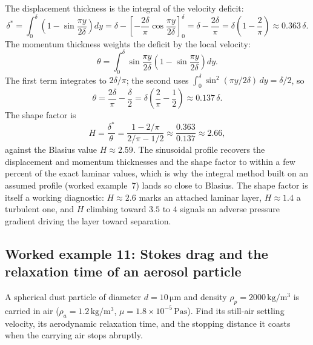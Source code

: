 The displacement thickness is the integral of the velocity deficit:
\[
\delta^* = \int_0^\delta\!\left(1 - \sin\frac{\pi y}{2\delta}\right)dy
= \delta - \left[-\frac{2\delta}{\pi}\cos\frac{\pi y}{2\delta}
\right]_0^\delta = \delta - \frac{2\delta}{\pi} = \delta\!\left(1 -
\frac{2}{\pi}\right) \approx 0.363\,\delta.
\]
The momentum thickness weights the deficit by the local velocity:
\[
\theta = \int_0^\delta \sin\frac{\pi y}{2\delta}\!\left(1 -
\sin\frac{\pi y}{2\delta}\right)dy.
\]
The first term integrates to $2\delta/\pi$; the second uses
$\int_0^\delta\sin^2(\pi y/2\delta)\,dy = \delta/2$, so
\[
\theta = \frac{2\delta}{\pi} - \frac{\delta}{2} = \delta\!\left(
\frac{2}{\pi} - \frac{1}{2}\right) \approx 0.137\,\delta.
\]
The shape factor is
\[
H = \frac{\delta^*}{\theta} = \frac{1 - 2/\pi}{2/\pi - 1/2} \approx
\frac{0.363}{0.137} \approx 2.66,
\]
against the Blasius value $H \approx 2.59$. The sinusoidal profile
recovers the displacement and momentum thicknesses and the shape
factor to within a few percent of the exact laminar values, which is
why the integral method built on an assumed profile (worked
example~7) lands so close to Blasius. The shape factor is itself a
working diagnostic: $H\approx2.6$ marks an attached laminar layer,
$H\approx1.4$ a turbulent one, and $H$ climbing toward $3.5$ to $4$
signals an adverse pressure gradient driving the layer toward
separation.



\subsection*{Worked example 11: Stokes drag and the relaxation time of an aerosol particle}

A spherical dust particle of diameter $d = 10\,\si{\micro\meter}$ and
density $\rho_p = 2000\,\si{\kilogram\per\meter\cubed}$ is carried in
air ($\rho_a = 1.2\,\si{\kilogram\per\meter\cubed}$, $\mu = 1.8\times
10^{-5}\,\si{\pascal\second}$). Find its still-air settling velocity,
its aerodynamic relaxation time, and the stopping distance it coasts
when the carrying air stops abruptly.

